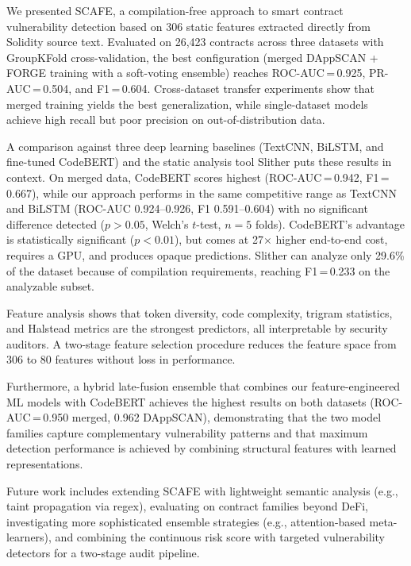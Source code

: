 \documentclass[11pt,a4paper]{article}
\newcommand{\MethodName}{SCAFE\xspace}
\begin{document}
We presented \MethodName, a compilation-free approach to smart contract vulnerability detection based on 306 static features extracted directly from Solidity source text.
Evaluated on 26,423 contracts across three datasets with GroupKFold cross-validation, the best configuration (merged DAppSCAN + FORGE training with a soft-voting ensemble) reaches ROC-AUC\,=\,0.925, PR-AUC\,=\,0.504, and F1\,=\,0.604.
Cross-dataset transfer experiments show that merged training yields the best generalization, while single-dataset models achieve high recall but poor precision on out-of-distribution data.

A comparison against three deep learning baselines (TextCNN, BiLSTM, and fine-tuned CodeBERT) and the static analysis tool Slither puts these results in context.
On merged data, CodeBERT scores highest (ROC-AUC\,=\,0.942, F1\,=\,0.667), while our approach performs in the same competitive range as TextCNN and BiLSTM (ROC-AUC 0.924--0.926, F1 0.591--0.604) with no significant difference detected ($p > 0.05$, Welch's $t$-test, $n = 5$ folds).
CodeBERT's advantage is statistically significant ($p < 0.01$), but comes at 27$\times$ higher end-to-end cost, requires a GPU, and produces opaque predictions.
Slither can analyze only 29.6\% of the dataset because of compilation requirements, reaching F1\,=\,0.233 on the analyzable subset.

Feature analysis shows that token diversity, code complexity, trigram statistics, and Halstead metrics are the strongest predictors, all interpretable by security auditors.
A two-stage feature selection procedure reduces the feature space from 306 to 80 features without loss in performance.

Furthermore, a hybrid late-fusion ensemble that combines our feature-engineered ML models with CodeBERT achieves the highest results on both datasets (ROC-AUC\,=\,0.950 merged, 0.962 DAppSCAN), demonstrating that the two model families capture complementary vulnerability patterns and that maximum detection performance is achieved by combining structural features with learned representations.

Future work includes extending \MethodName with lightweight semantic analysis (e.g., taint propagation via regex), evaluating on contract families beyond DeFi, investigating more sophisticated ensemble strategies (e.g., attention-based meta-learners), and combining the continuous risk score with targeted vulnerability detectors for a two-stage audit pipeline.



\end{document}
